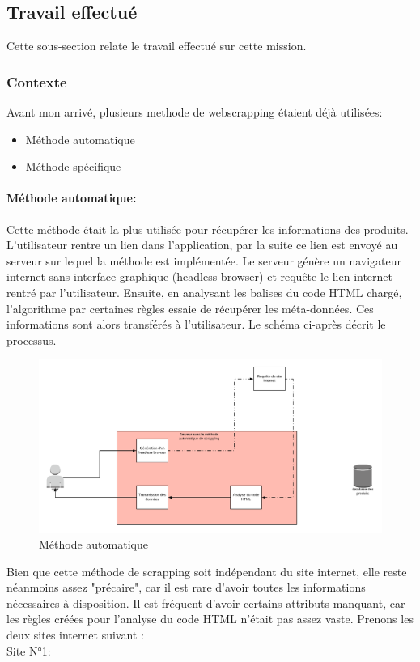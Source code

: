 \documentclass{article} %
\begin{document}
\subsection{Travail effectué}
Cette sous-section relate le travail effectué sur cette mission.
\subsubsection{Contexte\\}
Avant mon arrivé, plusieurs methode de webscrapping étaient déjà utilisées:
\begin{itemize}
	\itemsep 0em
	\item Méthode automatique
	\item Méthode spécifique
\end{itemize}
\paragraph{Méthode automatique:\\}
Cette méthode était la plus utilisée pour récupérer les informations des produits. L'utilisateur rentre un lien dans l'application, par la suite ce lien est envoyé au serveur sur lequel la méthode est implémentée. Le serveur génère un navigateur internet sans interface graphique (headless browser) et requête le lien internet rentré par l'utilisateur. Ensuite, en analysant les balises du code HTML chargé, l'algorithme par certaines règles essaie de récupérer les méta-données. Ces informations sont alors transférés à l'utilisateur. Le schéma ci-après décrit le processus.
\begin{figure}[!h]
	\centering
	\includegraphics[keepaspectratio = true,scale=0.6]{browserInject.png}
	\caption{Méthode automatique}
\end{figure}
Bien que cette méthode de scrapping soit indépendant du site internet, elle reste néanmoins assez "précaire", car il est rare d'avoir toutes les informations nécessaires à disposition. Il est fréquent d'avoir certains attributs manquant, car les règles créées pour l'analyse du code HTML n'était pas assez vaste. Prenons les deux sites internet suivant :\\
\newpage
Site N°1:

\end{document}
